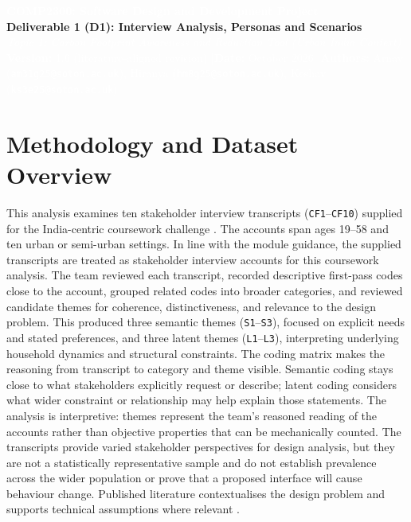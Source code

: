 \documentclass[12pt, a4paper]{article}
\begin{document}
\begin{tcolorbox}[enhanced, colback=cNavy, colframe=cNavy, arc=3pt, left=8pt, right=8pt, top=7pt, bottom=7pt]
\begin{center}
    {\Large\bfseries\textcolor{white}{COMP2300: Software Design and Development Project}}\\[0.2em]
    {\large\bfseries\textcolor{bgSand}{Deliverable 1 (D1): Interview Analysis, Personas and Scenarios}}\\[0.15em]
    {\small\itshape\textcolor{white}{Topic 1: Carbon Footprint Awareness and Reduction Tool (Urban India Context)}}\\[0.35em]
    {\footnotesize\textcolor{white}{\textbf{Version:} 1.6 (literature-aligned revision) \quad|\quad \textbf{Date:} October 2026 \quad|\quad \textbf{Authors:} Arnav (\texttt{am31g25@soton.ac.uk}), Hiranya (\texttt{hm8g25@soton.ac.uk}), Keshav (\texttt{ks3e25@soton.ac.uk})}}
\end{center}
\end{tcolorbox}

\section{Methodology and Dataset Overview}
This analysis examines ten stakeholder interview transcripts (\texttt{CF1}--\texttt{CF10}) supplied for the India-centric coursework challenge \cite{cf1, cf2, cf3, cf4, cf5, cf6, cf7, cf8, cf9, cf10}. The accounts span ages 19--58 and ten urban or semi-urban settings. In line with the module guidance, the supplied transcripts are treated as stakeholder interview accounts for this coursework analysis. The team reviewed each transcript, recorded descriptive first-pass codes close to the account, grouped related codes into broader categories, and reviewed candidate themes for coherence, distinctiveness, and relevance to the design problem. This produced three semantic themes (\texttt{S1}--\texttt{S3}), focused on explicit needs and stated preferences, and three latent themes (\texttt{L1}--\texttt{L3}), interpreting underlying household dynamics and structural constraints. The coding matrix makes the reasoning from transcript to category and theme visible. Semantic coding stays close to what stakeholders explicitly request or describe; latent coding considers what wider constraint or relationship may help explain those statements. The analysis is interpretive: themes represent the team's reasoned reading of the accounts rather than objective properties that can be mechanically counted. The transcripts provide varied stakeholder perspectives for design analysis, but they are not a statistically representative sample and do not establish prevalence across the wider population or prove that a proposed interface will cause behaviour change. Published literature contextualises the design problem and supports technical assumptions where relevant \cite{shi2021, lee2021}.
\end{document}
